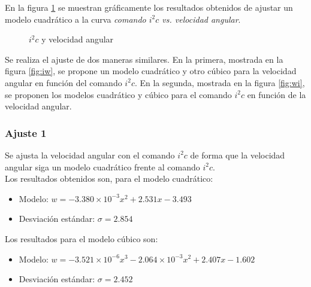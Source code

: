 \documentclass[spanish,12pt,a4paper,titlepage]{report}
\begin{document}
En la figura \ref{fig:iwi} se muestran gráficamente los resultados obtenidos de ajustar un modelo cuadrático a la curva \emph{comando $i^2c$ vs. velocidad angular}.

\begin{figure} [h!]
\centering
  \caption{$i^2c$ y velocidad angular}
  \label{fig:iwi}
\end{figure}

Se realiza el ajuste de dos maneras similares. En la primera, mostrada en la figura \ref{fig:iw}, se propone un modelo cuadrático y otro cúbico para la velocidad angular en función del comando $i^2c$. En la segunda, mostrada en la figura \ref{fig:wi}, se proponen los modelos cuadrático y cúbico para el comando $i^2c$ en función de la velocidad angular.

\subsubsection*{Ajuste 1}
Se ajusta la velocidad angular con el comando $i^2c$ de forma que la velocidad angular siga un modelo cuadrático frente al comando $i^2c$.\\

Los resultados obtenidos son, para el modelo cuadrático:
\begin{itemize}
\item Modelo: $w=-3.380\times 10^{-3}x^2+2.531x-3.493$
\item Desviación estándar: $\sigma = 2.854$
\end{itemize}
Los resultados para el modelo cúbico son:
\begin{itemize}
\item Modelo: $w=-3.521\times 10^{-6}x^3-2.064\times 10^{-3}x^2+2.407x-1.602$
\item Desviación estándar: $\sigma = 2.452$
\end{itemize}
\end{document}
